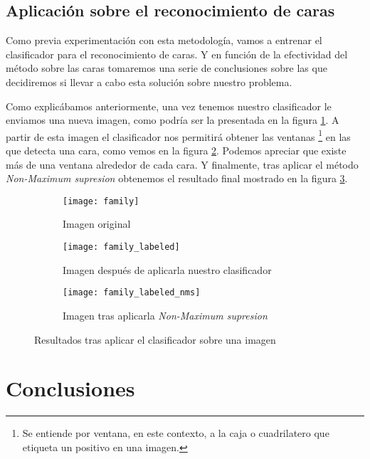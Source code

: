 \subsection{Aplicación sobre el reconocimiento de caras}

Como previa experimentación con esta metodología, vamos a entrenar el clasificador para el reconocimiento de caras. Y en función de la efectividad del método sobre las caras tomaremos una serie de conclusiones sobre las que decidiremos si llevar a cabo esta solución sobre  nuestro problema.

Como explicábamos anteriormente, una vez tenemos nuestro clasificador le enviamos una nueva imagen, como podría ser la presentada en la figura \ref{subfig:family}. A partir de esta imagen el clasificador nos permitirá obtener las ventanas \footnote{Se entiende por ventana, en este contexto, a la caja o cuadrilatero que etiqueta un positivo en una imagen.} en las que detecta una cara, como vemos en la figura \ref{subfig:family_labeled}. Podemos apreciar que existe más de una ventana alrededor de cada cara. Y finalmente, tras aplicar el método \textit{Non-Maximum supresion} obtenemos el resultado final mostrado en la figura \ref{subfig:family_labeled_nms}.

\begin{figure}
	\centering
	\begin{subfigure}[b]{0.45\textwidth}
        \texttt{[image: family]}
        \caption{Imagen original}
        \label{subfig:family}
    \end{subfigure}
    \begin{subfigure}[b]{0.45\textwidth}
        \texttt{[image: family\_labeled]}
        \caption{Imagen después de aplicarla nuestro clasificador}
        \label{subfig:family_labeled}
    \end{subfigure}
    \begin{subfigure}[b]{0.45\textwidth}
        \texttt{[image: family\_labeled\_nms]}
        \caption{Imagen tras aplicarla \textit{Non-Maximum supresion}}
         \label{subfig:family_labeled_nms}
    \end{subfigure}
        \caption{Resultados tras aplicar el clasificador sobre una imagen}
	\label{fig:5.1.4}
\end{figure}

\section{Conclusiones}

